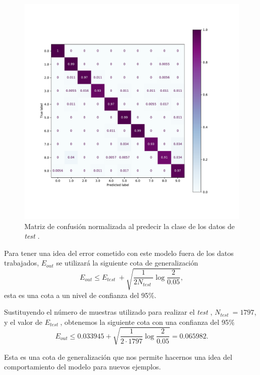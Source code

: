 \documentclass[a4paper, 20pt]{article}
\newcommand{\test}{\textit{test }}
\begin{document}
{\begin{figure}[H]
    \centering
    \includegraphics[width=\textwidth]{conf_mat}
    \caption{Matriz de confusión normalizada al predecir la clase de los datos de \test.}
    \label{fig:cm}
\end{figure}

Para tener una idea del error cometido con este modelo fuera de los datos trabajados, $E_{out}$ se utilizará la siguiente cota de generalización\[
E_{out}\leq E_{\test} + \sqrt{\frac{1}{2N_{\test}} \log \frac{2}{0.05}},
  \]
  esta es una cota a un nivel de confianza del 95\%.
  
  Sustituyendo el número de muestras utilizado para realizar el \test, $N_{\test} = 1797$, y el valor de $E_{\test}$, obtenemos la siguiente cota con una confianza del 95\%\[
E_{out}\leq 0.033945 + \sqrt{\frac{1}{2\cdot 1797} \log \frac{2}{0.05}} = 0.065982.
\]

Esta es una cota de generalización que nos permite hacernos una idea del comportamiento del modelo para nuevos ejemplos.

}
\end{document}
